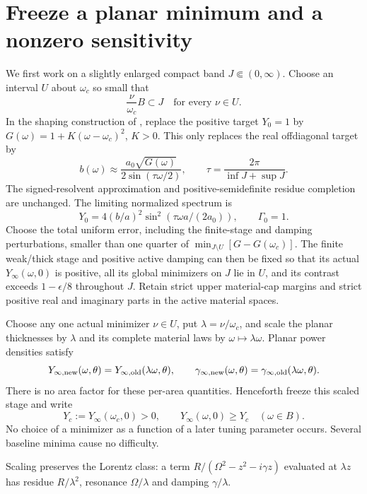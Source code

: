 \documentclass[11pt]{article}
\begin{document}
\section{Freeze a planar minimum and a nonzero sensitivity}
We first work on a slightly enlarged compact band $J\Subset(0,\infty)$.
Choose an interval $U$ about $\omega_c$ so small that
\[
 \frac{\nu}{\omega_c}B\subset J\quad\text{for every }\nu\in U.
\]
In the shaping construction of \cite{strict}, replace the positive target
$Y_0=1$ by $G(\omega)=1+K(\omega-\omega_c)^2$, $K>0$.
This only replaces the real offdiagonal target by
\[
 b(\omega)\approx
 \frac{a_0\sqrt{G(\omega)}}{2\sin(\tau\omega/2)},\qquad
 \tau=\frac{2\pi}{\inf J+\sup J}.
\]
The signed-resolvent approximation and positive-semidefinite residue
completion are unchanged. The limiting normalized spectrum is
\begin{equation}\label{eq:ideal}
 Y_0=4(b/a)^2\sin^2(\tau\omega a/(2a_0)),\qquad \Gamma_0=1.
\end{equation}
Choose the total uniform error, including the finite-stage and damping
perturbations, smaller than one quarter of
$\min_{J\setminus U}[G-G(\omega_c)]$. The finite weak/thick stage and positive
active damping can then be fixed so that its actual
$Y_\infty(\omega,0)$ is positive, all its global minimizers on $J$ lie in $U$,
and its contrast exceeds $1-\epsilon/8$ throughout $J$.
Retain strict upper material-cap margins and strict positive real and
imaginary parts in the active material spaces.

Choose any one actual minimizer $\nu\in U$, put $\lambda=\nu/\omega_c$, and
scale the planar thicknesses by $\lambda$ and its complete material laws by
$\omega\mapsto\lambda\omega$.
Planar power densities satisfy
\[
 Y_{\infty,{\rm new}}(\omega,\theta)
   =Y_{\infty,{\rm old}}(\lambda\omega,\theta),
 \qquad
 \gamma_{\infty,{\rm new}}(\omega,\theta)
   =\gamma_{\infty,{\rm old}}(\lambda\omega,\theta).
\]
There is no area factor for these per-area quantities. Henceforth freeze this
scaled stage and write
\begin{equation}\label{eq:baseline-min}
 Y_c:=Y_\infty(\omega_c,0)>0,\qquad
 Y_\infty(\omega,0)\ge Y_c\quad(\omega\in B).
\end{equation}
No choice of a minimizer as a function of a later tuning parameter occurs.
Several baseline minima cause no difficulty.

Scaling preserves the Lorentz class: a term
$R/(\Omega^2-z^2-i\gamma z)$ evaluated at $\lambda z$ has residue
$R/\lambda^2$, resonance $\Omega/\lambda$ and damping $\gamma/\lambda$.
\end{document}
